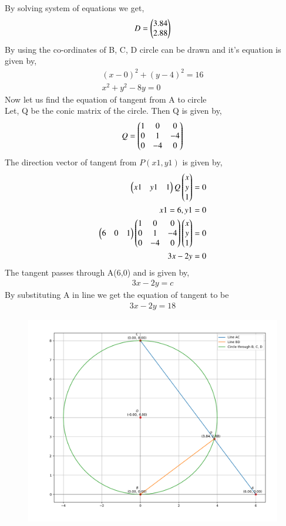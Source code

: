 \documentclass[journal]{IEEEtran}
\begin{document}
By solving system of equations we get,
\begin{align}
    D=\begin{pmatrix}3.84\\2.88\end{pmatrix}
\end{align}
By using the co-ordinates of B, C, D circle can be drawn and it's equation is given by,
\begin{align}
    (x-0)^{2}+(y-4)^{2}=16 \\
    x^2+y^2-8y=0
\end{align}
Now let us find the equation of tangent from A to circle \\
Let, Q be the conic matrix of the circle. Then Q is given by,
\begin{align}
    Q=\begin{pmatrix}1&0&0\\0&1&-4\\0&-4&0\end{pmatrix}
\end{align}
The direction vector of tangent from $P(x1,y1)$ is given by,
\begin{align}
    \begin{pmatrix}x1&y1&1\end{pmatrix}Q\begin{pmatrix}x\\y\\1\end{pmatrix} =0\\
    x1=6,y1=0\\
    \begin{pmatrix}6&0&1\end{pmatrix}\begin{pmatrix}1&0&0\\0&1&-4\\0&-4&0\end{pmatrix}\begin{pmatrix}x\\y\\1\end{pmatrix} =0\\
    3x-2y=0
\end{align}
The tangent passes through A(6,0) and is given by,
\begin{align}
    3x-2y=c
\end{align}
By substituting A in line we get the equation of tangent to be 
\begin{align}
    3x-2y=18
\end{align}
\begin{figure}[h!]
   \centering
   \includegraphics[width=0.7\linewidth]{figure_1.png}
   \label{stemplot}
\end{figure}
\end{document}
